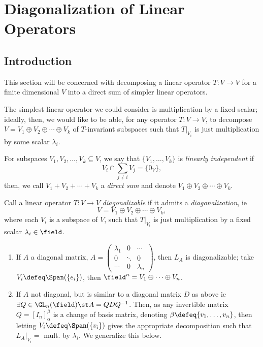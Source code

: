 \section{Diagonalization of Linear Operators}

\subsection{Introduction}

This section will be concerned with decomposing a linear operator $T : V \to V$ for a finite dimensional $V$ into a direct sum of simpler linear operators.

The simplest linear operator we could consider is multiplication by a fixed scalar; ideally, then, we would like to be able, for any operator $T : V \to V$, to decompose $V = V_1 \oplus V_2 \oplus \cdots \oplus V_k$ of $T$-invariant subspaces such that $T|_{V_{i}}$ is just multiplication by some scalar $\lambda_i$.


\begin{definition}
    For subspaces $V_1, V_2, \dots, V_k \subseteq V$, we say that $\{V_1, \dots, V_k\}$ is \emph{linearly independent} if $$V_i \cap \sum_{j \neq i} V_j = \{0_V\},$$ then, we call $V_1 + V_2 + \cdots + V_k$ a \emph{direct sum} and denote $V_1 \oplus V_2 \oplus \cdots \oplus V_k$.
\end{definition}

\begin{definition}[Diagonalization]
    Call a linear operator $T : V\to V$ \emph{diagonalizable} if it admits a \emph{diagonalization}, ie \[
    V = V_1 \oplus V_2 \oplus \cdots \oplus V_k,    
    \]
    where each $V_i$ is a subspace of $V$, such that $T\vert_{V_i}$ is just multiplication by a fixed scalar $\lambda_i \in \field$.
\end{definition}

\begin{example}
    \begin{enumerate}
        \item If $A$ a diagonal matrix, $A = \begin{pmatrix}
            \lambda_1 & 0 & \cdots\\
            0 & \ddots & 0\\
            \cdots & 0 & \lambda_n
        \end{pmatrix}$, then $L_A$ is diagonalizable; take $V_i \defeq \Span(\{e_i\})$, then $\field^n = V_1 \oplus \cdots \oplus V_n$.
        \item If $A$ not diagonal, but is similar to a diagonal matrix $D$ as above ie $\exists Q \in \GL_n(\field)\st A = Q D Q^{-1}$. Then, as any invertible matrix $Q = [I_n]_\alpha^\beta$ is a change of basis matrix, denoting $\beta \defeq \{v_1, \dots, v_n\}$, then letting $V_i \defeq \Span (\{v_i\})$ gives the appropriate decomposition such that $L_A \vert_{V_i} = $ mult. by $\lambda_i$. We generalize this below.
    \end{enumerate}
\end{example}

